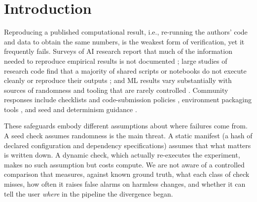 \documentclass[11pt]{article}
\begin{document}
\section{Introduction}

Reproducing a published computational result, i.e., re-running the authors' code and data to obtain the same numbers, is the weakest form of verification, yet it frequently fails. Surveys of AI research report that much of the information needed to reproduce empirical results is not documented \citep{gundersen2018state}; large studies of research code find that a majority of shared scripts or notebooks do not execute cleanly or reproduce their outputs \citep{pimentel2019jupyter,trisovic2022code}; and ML results vary substantially with sources of randomness and tooling that are rarely controlled \citep{bouthillier2021accounting,zhuang2022randomness}. Community responses include checklists and code-submission policies \citep{pineau2021improving}, environment packaging tools \citep{chirigati2016reprozip}, and seed and determinism guidance \citep{dutta2022seed}.

These safeguards embody different assumptions about where failures come from. A seed check assumes randomness is the main threat. A static manifest (a hash of declared configuration and dependency specifications) assumes that what matters is written down. A dynamic check, which actually re-executes the experiment, makes no such assumption but costs compute. We are not aware of a controlled comparison that measures, against known ground truth, what each class of check misses, how often it raises false alarms on harmless changes, and whether it can tell the user \emph{where} in the pipeline the divergence began.
\end{document}
